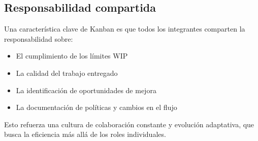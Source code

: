 \subsection{Responsabilidad compartida}

Una característica clave de Kanban es que todos los integrantes comparten la responsabilidad sobre:
\begin{itemize}
    \item El cumplimiento de los límites WIP
    \item La calidad del trabajo entregado
    \item La identificación de oportunidades de mejora
    \item La documentación de políticas y cambios en el flujo
\end{itemize}

Esto refuerza una cultura de colaboración constante y evolución adaptativa, que busca la eficiencia más allá de los roles individuales.


